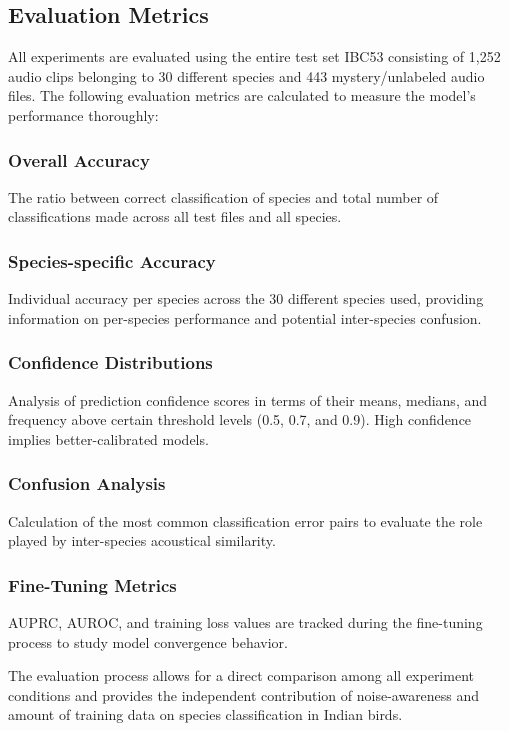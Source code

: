 \documentclass[conference]{IEEEtran}
\begin{document}
\subsection{Evaluation Metrics}

All experiments are evaluated using the entire test set IBC53 consisting of 1,252 audio clips belonging to 30 different species and 443 mystery/unlabeled audio files. The following evaluation metrics are calculated to measure the model's performance thoroughly:

\subsubsection{Overall Accuracy}
The ratio between correct classification of species and total number of classifications made across all test files and all species.

\subsubsection{Species-specific Accuracy}
Individual accuracy per species across the 30 different species used, providing information on per-species performance and potential inter-species confusion.

\subsubsection{Confidence Distributions}
Analysis of prediction confidence scores in terms of their means, medians, and frequency above certain threshold levels (0.5, 0.7, and 0.9). High confidence implies better-calibrated models.

\subsubsection{Confusion Analysis}
Calculation of the most common classification error pairs to evaluate the role played by inter-species acoustical similarity.

\subsubsection{Fine-Tuning Metrics}
AUPRC, AUROC, and training loss values are tracked during the fine-tuning process to study model convergence behavior.

The evaluation process allows for a direct comparison among all experiment conditions and provides the independent contribution of noise-awareness and amount of training data on species classification in Indian birds.
\end{document}
